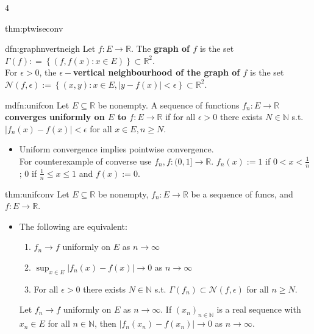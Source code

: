 \documentclass[landscape, 8pt]{extarticle}
\begin{document}
\begin{multicols*}{4}
\begin{thm}{thm:ptwiseconv}{ }
		\end{thm}
		
		
		\begin{dfn}{dfn:graphnvertneigh}{ }
		Let $f: E \to \mathbb{R}$. The \textbf{graph of $f$} is the set $\Gamma(f) : = \left\{(f, f(x) : x\in E)\right\} \subset \mathbb{R}^2$.\\
		For $ \epsilon > 0$, the \textbf{$\epsilon-$vertical neighbourhood of the graph of $f$} is the set \\
		$\mathcal{N}(f,\epsilon) := \left\{(x, y) : x\in E, \left|y-f(x)\right| <\epsilon\right\} \subset \mathbb{R}^2$.
		
		\end{dfn}
		
		
		\begin{mdfn}{mdfn:unifcon}{ }
		Let $E \subseteq \mathbb{R}$ be nonempty. A sequence of functions $f_n: E \to \mathbb{R}$ \textbf{converges uniformly on $E$ to $f: E \to \mathbb{R}$} if for all $\epsilon > 0$ there exists $N\in \mathbb{N}$ s.t. $\left|f_n(x) - f(x)\right| <\epsilon$ for all $x\in E, n \ge N$.
		\begin{itemize}
			\item Uniform convergence implies pointwise convergence. \\
			For counterexample of converse use $f_n, f: (0, 1]  \to \mathbb{R}$. $f_n(x) := 1 $ if $0 < x < \frac{1}{n}$; $0$ if $\frac{1}{n} \le x \le 1$ and $f(x) :=0$.
		\end{itemize}
		
		\end{mdfn}
		
		
		\begin{mthm}{thm:unifconv}{ }
		Let $E \subseteq \mathbb{R}$ be nonempty, $f_n : E \to \mathbb{R}$ be a sequence of funcs, and $f: E \to \mathbb{R}$.
		\begin{itemize}
			\item The following are equivalent:
			\begin{enumerate}[label=(\arabic*)]
				\item $f_n \to f$ uniformly on $E$ as $n \to \infty$
				\item $\sup_{x\in E}\left|f_n(x) - f(x)\right| \to 0$ as $n \to \infty$
				\item For all $\epsilon > 0$ there exists $N\in \mathbb{N}$ s.t. $\Gamma(f_n) \subset \mathcal{N}(f,\epsilon)$ for all $n \ge N$.
			\end{enumerate}
			Let $f_n \to f$ uniformly on $E$ as $n \to \infty$. If $(x_n)_{n\in \mathbb{N}}$ is a real sequence with $x_n\in E$ for all $n\in \mathbb{N}$, then $\left|f_n(x_n) - f(x_n)\right| \to 0$ as $n \to \infty$.
		\end{itemize}
		

\end{mthm}
\end{multicols*}
\end{document}
